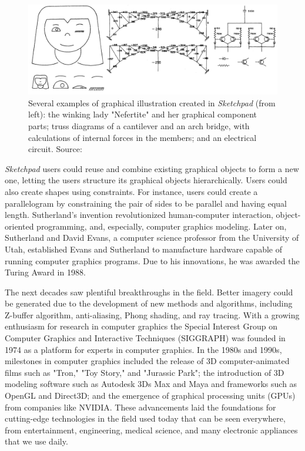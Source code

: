 \documentclass[conference]{IEEEtran}
\begin{document}
\begin{figure}[htb!]
    \centering
    \includegraphics[width=1\linewidth]{sketchpad2.png}
    \caption{Several examples of graphical illustration created in \textit{Sketchpad} (from left): the winking lady 
    "Nefertite" and her graphical component parts; truss diagrams of a cantilever and an arch bridge, with calculations 
    of internal forces in the members; and an electrical circuit. Source: \cite{sutherland}}
\end{figure}
\textit{Sketchpad} users could reuse and combine existing graphical objects to form a new one, letting the users structure its graphical objects hierarchically. Users could also create shapes using constraints. For instance, users could create a parallelogram by constraining the pair of sides to be parallel and having equal length. Sutherland's invention revolutionized human-computer interaction, object-oriented programming, and, especially, computer graphics modeling. Later on, Sutherland and David Evans, a computer science professor from the University of Utah, established Evans and Sutherland to manufacture hardware capable of running computer graphics programs. Due to his innovations, he was awarded the Turing Award in 1988\cite{acm}.


The next decades saw plentiful breakthroughs in the field. Better imagery could be generated due to the development of new methods and algorithms, including Z-buffer algorithm, anti-aliasing, Phong shading, and ray tracing\cite{history}. With a growing enthusiasm for research in computer graphics the Special Interest Group on Computer Graphics and Interactive Techniques (SIGGRAPH) was founded in 1974 as a platform for experts in computer graphics\cite{siggraph}. In the 1980s and 1990s, milestones in computer graphics included the release of 3D computer-animated films such as "Tron," "Toy Story," and "Jurassic Park"; the introduction of 3D modeling software such as Autodesk 3Ds Max and Maya and frameworks such as OpenGL and Direct3D; and the emergence of graphical processing units (GPUs) from companies like NVIDIA\cite{history}\cite{cgi-movie}. These advancements laid the foundations for cutting-edge technologies in the field used today that can be seen everywhere, from entertainment, engineering, medical science, and many electronic appliances that we use daily.
\end{document}

